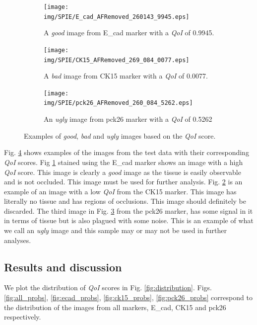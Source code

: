 \begin{figure} [ht!]
    \centering
    \begin{subfigure}[b]{0.3\textwidth}
        \centering
        \texttt{[image: img/SPIE/E\_cad\_AFRemoved\_260143\_9945.eps]}
        \caption{A \textit{good} image from E\_cad marker with a \textit{QoI} of 0.9945.}
        \label{fig:good}
    \end{subfigure}
    \hfill
    \begin{subfigure}[b]{0.3\textwidth}
        \centering
        \texttt{[image: img/SPIE/CK15\_AFRemoved\_269\_084\_0077.eps]}
        \caption{A \textit{bad} image from CK15 marker with a \textit{QoI} of 0.0077.}
        \label{fig:bad}
    \end{subfigure}
    \hfill
    \begin{subfigure}[b]{0.3\textwidth}
        \centering
        \texttt{[image: img/SPIE/pck26\_AFRemoved\_260\_084\_5262.eps]}
        \caption{An \textit{ugly} image from pck26 marker with a \textit{QoI} of 0.5262}
        \label{fig:ugly}
    \end{subfigure}
    \caption{Examples of \textit{good}, \textit{bad} and \textit{ugly} images based on the \textit{QoI} score.}
    \label{fig:gbu}
\end{figure}

Fig. \ref{fig:gbu} shows examples of the images from the test data with their corresponding \textit{QoI} scores. Fig \ref{fig:good} stained using the E\_cad marker shows an image with a high \textit{QoI} score. This image is clearly a \textit{good} image as the tissue is easily observable and is not occluded. This image must be used for further analysis. Fig. \ref{fig:bad} is an example of an image with a low \textit{QoI} from the CK15 marker. This image has literally no tissue and has regions of occlusions. This image should definitely be discarded. The third image in Fig. \ref{fig:ugly} from the pck26 marker, has some signal in it in terms of tissue but is also plagued with some noise. This is an example of what we call an \textit{ugly} image and this sample may or may not be used in further analyses.

\subsection{Results and discussion}
We plot the distribution of \textit{QoI} scores in Fig. \ref{fig:distribution}. Figs. \ref{fig:all_probs}, \ref{fig:ecad_probs}, \ref{fig:ck15_probs}, \ref{fig:pck26_probs} correspond to the distribution of the images from all markers, E\_cad, CK15 and pck26 respectively. 

